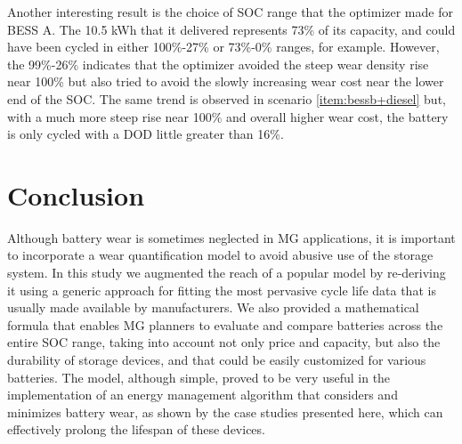 \documentclass{ieeeaccess}
\begin{document}
    Another interesting result is the choice of SOC range that the optimizer made for BESS A. The 10.5 kWh that it delivered represents 73\% of its capacity, and could have been cycled in either 100\%-27\% or 73\%-0\% ranges, for example. However, the 99\%-26\% indicates that the optimizer avoided the steep wear density rise near 100\% but also tried to avoid the slowly increasing wear cost near the lower end of the SOC. The same trend is observed in scenario \ref{item:bessb+diesel} but, with a much more steep rise near 100\% and overall higher wear cost, the battery is only cycled with a DOD little greater than 16\%.

    \section{Conclusion}
    Although battery wear is sometimes neglected in MG applications, it is important to incorporate a wear quantification model to avoid abusive use of the storage system. In this study we augmented the reach of a popular model by re-deriving it using a generic approach for fitting the most pervasive cycle life data that is usually made available by manufacturers. We also provided a mathematical formula that enables MG planners to evaluate and compare batteries across the entire SOC range, taking into account not only price and capacity, but also the durability of storage devices, and that could be easily customized for various batteries. The model, although simple, proved to be very useful in the implementation of an energy management algorithm that considers and minimizes battery wear, as shown by the case studies presented here, which can effectively prolong the lifespan of these devices.

    
    

\EOD
\end{document}
